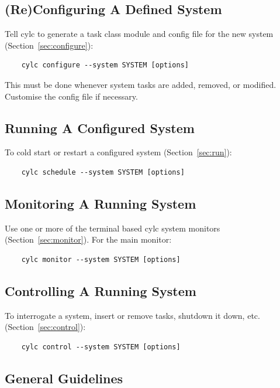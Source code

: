 \documentclass[11pt,a4paper]{article}
\begin{document}
\subsection{(Re)Configuring A Defined System}

Tell cylc to generate a task class module and config file for the new
system (Section~\ref{sec:configure}): 

\begin{lstlisting}
    cylc configure --system SYSTEM [options]
\end{lstlisting}

This must be done whenever system tasks are added, removed, or modified.
Customise the config file if necessary.

\subsection{Running A Configured System}

To cold start or restart a configured system (Section~\ref{sec:run}):

\begin{lstlisting}
    cylc schedule --system SYSTEM [options]
\end{lstlisting}
    
\subsection{Monitoring A Running System}

Use one or more of the terminal based cylc system monitors
(Section~\ref{sec:monitor}). For the main monitor: 

\begin{lstlisting}
    cylc monitor --system SYSTEM [options]
\end{lstlisting}

\subsection{Controlling A Running System}

To interrogate a system, insert or remove tasks, shutdown it down, etc.
(Section~\ref{sec:control}):

\begin{lstlisting}
    cylc control --system SYSTEM [options]
\end{lstlisting}


\subsection{General Guidelines}
\end{document}
